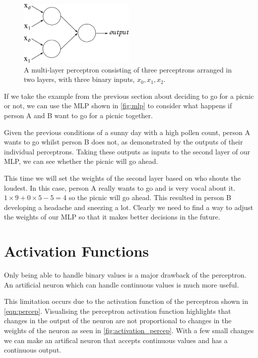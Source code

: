 \begin{figure}
	\centering
	\includegraphics[width=0.5\textwidth]{Figs/intro2dl/mlp.png}
	
	\caption{A multi-layer perceptron consisting of three perceptrons arranged in two layers, with three binary inputs, $x_0, x_1, x_2$.}
	\label{fig:mlp}
\end{figure}

If we take the example from the previous section about deciding to go for a picnic or not, we can use the MLP shown in \autoref{fig:mlp} to consider what happens if person A and B want to go for a picnic together.

Given the previous conditions of a sunny day with a high pollen count, person A wants to go whilst person B does not, as demonstrated by the outputs of their individual perceptrons. Taking these outputs as inputs to the second layer of our MLP, we can see whether the picnic will go ahead.

This time we will set the weights of the second layer based on who shouts the loudest. In this case, person A really wants to go and is very vocal about it. $1 \times 9 + 0 \times 5 - 5 = 4$ so the picnic will go ahead. This resulted in person B developing a headache and sneezing a lot. Clearly we need to find a way to adjust the weights of our MLP so that it makes better decisions in the future.

\section{Activation Functions}

Only being able to handle binary values is a major drawback of the perceptron. An artificial neuron which can handle continuous values is much more useful.

This limitation occurs due to the activation function of the perceptron shown in \autoref{eqn:percep}. Visualising the perceptron activation function highlights that changes in the output of the neuron are not proportional to changes in the weights of the neuron as seen in \autoref{fig:activation_percep}. With a few small changes we can make an artifical neuron that accepts continuous values and has a continuous output.

